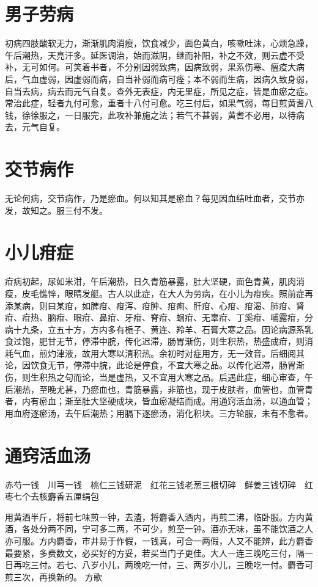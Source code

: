 \documentclass[a4paper,12pt,UTF8,twoside]{ctexbook}
\begin{document}
	\section{男子劳病}
	初病四肢酸软无力，渐渐肌肉消瘦，饮食减少，面色黄白，咳嗽吐沫，心烦急躁，午后潮热，天亮汗多。延医调治，始而滋阴，继而补阳，补之不效，则云虚不受补，无可如何。可笑着书者，不分别因弱致病，因病致弱，果系伤寒、瘟疫大病后，气血虚弱，因虚弱而病，自当补弱而病可痊；本不弱而生病，因病久致身弱，自当去病，病去而元气自复。查外无表症，内无里症，所见之症，皆是血瘀之症。常治此症，轻者九付可愈，重者十八付可愈。吃三付后，如果气弱，每日煎黄耆八钱，徐徐服之，一日服完，此攻补兼施之法；若气不甚弱，黄耆不必用，以待病去，元气自复。
	\section{交节病作}
	无论何病，交节病作，乃是瘀血。何以知其是瘀血？每见因血结吐血者，交节亦发，故知之。服三付不发。
	\section{小儿疳症}
	疳病初起，尿如米泔，午后潮热，日久青筋暴露，肚大坚硬，面色青黄，肌肉消瘦，皮毛憔悴，眼睛发艇。古人以此症，在大人为劳病，在小儿为疳疾。照前症再添某病，则曰某疳，如脾疳、疳泻、疳肿、疳痢、肝疳、心疳、疳渴、肺疳、肾疳、疳热、脑疳、眼疳、鼻疳、牙疳、脊疳、蛔疳、无辜疳、丁奚疳、哺露疳，分病十九条，立五十方，方内多有栀子、黄连、羚羊、石膏大寒之品。因论病源系乳食过饱，肥甘无节，停滞中脘，传化迟滞，肠胃渐伤，则生积热，热盛成疳，则消耗气血，煎灼津液，故用大寒以清积热。余初时对症用方，无一效音。后细阅其论，因饮食无节，停滞中脘，此论是停食，不宜大寒之品。以传化迟滞，肠胃渐伤，则生积热之句而论，当是虚热，又不宜用大寒之品。后遇此症，细心审查，午后潮热，至晚尤甚，乃瘀血也，青筋暴露，非筋也，现于皮肤者，血管也，血管青者，内有瘀血；渐至肚大坚硬成块，皆血瘀凝结而成。用通窍活血汤，以通血管；用血府逐瘀汤，去午后潮热；用膈下逐瘀汤，消化积块。三方轮服，未有不愈者。
	\section{通窍活血汤}
	赤芍一钱　川芎一钱　桃仁三钱研泥　红花三钱老葱三根切碎　鲜姜三钱切碎　红枣七个去核麝香五厘绢包
	
	用黄酒半斤，将前七味煎一钟，去渣，将麝香入酒内，再煎二沸，临卧服。方内黄酒，各处分两不同，宁可多二两，不可少，煎至一钟。酒亦无味，虽不能饮酒之人亦可服。方内麝香，市井易于作假，一钱真，可合一两假，人又不能辨，此方麝香最要紧，多费数文，必买好的方妥，若买当门子更佳。大人一连三晚吃三付，隔一日再吃三付。若七、八岁小儿，两晚吃一付，三、两岁小儿，三晚吃一付。麝香可煎三次，再换新的。
	方歌
	
\end{document}
